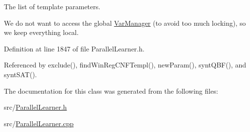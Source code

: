 The list of template parameters. 

We do not want to access the global \hyperlink{classVarManager}{Var\-Manager} (to avoid too much locking), so we keep everything local. 

Definition at line 1847 of file Parallel\-Learner.\-h.



Referenced by exclude(), find\-Win\-Reg\-C\-N\-F\-Templ(), new\-Param(), synt\-Q\-B\-F(), and synt\-S\-A\-T().



The documentation for this class was generated from the following files\-:\begin{DoxyCompactItemize}
\item 
src/\hyperlink{ParallelLearner_8h}{Parallel\-Learner.\-h}\item 
src/\hyperlink{ParallelLearner_8cpp}{Parallel\-Learner.\-cpp}\end{DoxyCompactItemize}
